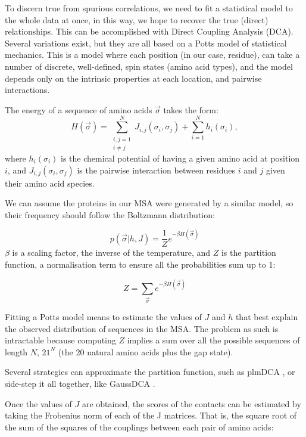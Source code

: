 To discern true from spurious correlations, we need to fit a statistical model to the whole data at once, in this way, we hope to recover the true (direct) relationships.
This can be accomplished with Direct Coupling Analysis (DCA).
Several variations exist, but they are all based on a Potts model of statistical mechanics.
This is a model where each position (in our case, residue), can take a number of discrete, well-defined, spin states (amino acid types), and the model depends only on the intrinsic properties at each location, and pairwise interactions.

The energy of a sequence of amino acids $\vec{\sigma}$ takes the form:
\begin{equation*}
H(\vec \sigma) = \sum_{\substack{i,j=1\\i \neq j}}^N J_{i, j}(\sigma_i, \sigma_j) + \sum_{i=1}^N h_i(\sigma_i),
\end{equation*}
where $h_i(\sigma_i)$ is the chemical potential of having a given amino acid at position $i$, and $ J_{i, j}(\sigma_i, \sigma_j)$ is the pairwise interaction between residues $i$ and $j$ given their amino acid species.

We can assume the proteins in our MSA were generated by a similar model, so their frequency should follow the Boltzmann distribution:

\begin{equation*}
p(\vec{\sigma} |  h, J) = \frac{1}{Z} e^{-\beta H\left(\vec{\sigma}\right)}
\end{equation*}
$\beta$ is a scaling factor, the inverse of the temperature, and $Z$ is the partition function, a normalisation term to ensure all the probabilities sum up to 1:

\begin{equation*}
Z = \sum_{\vec{\sigma}} e^{-\beta H\left(\vec{\sigma}\right)}
\end{equation*}

Fitting a Potts model means to estimate the values of $J$ and $h$ that best explain the observed distribution of sequences in the MSA.
The problem as such is intractable because computing $Z$ implies a sum over all the possible sequences of length $N$, $21^N$ (the 20 natural amino acids plus the gap state).

Several strategies can approximate the partition function, such as plmDCA \citep{plmDCA}, or side-step it all together, like GaussDCA \citep{GaussDCA}.

Once the values of $J$ are obtained, the scores of the contacts can be estimated by taking the Frobenius norm of each of the J matrices.
That is, the square root of the sum of the squares of the couplings between each pair of amino acids:

